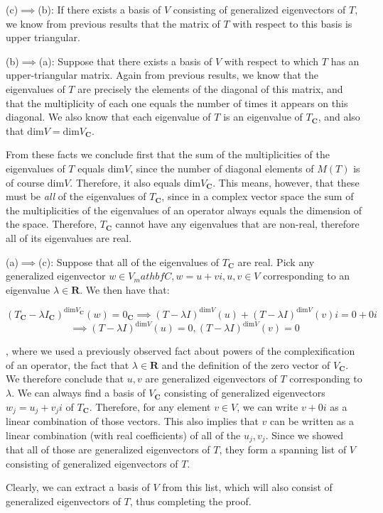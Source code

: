 \begin{solution}

    (c)$\implies$(b): If there exists a basis of $V$ consisting of generalized eigenvectors of $T$, we know from previous results that the matrix of $T$ with respect to this basis is upper triangular.

    (b)$\implies$(a): Suppose that there exists a basis of $V$ with respect to which $T$ has an upper-triangular matrix. Again from previous results, we know that the eigenvalues of $T$ are precisely the elements of the diagonal of this matrix, and that the multiplicity of each one equals the number of times it appears on this diagonal. We also know that each eigenvalue of $T$ is an eigenvalue of $T_\mathbf{C}$, and also that $\text{dim} V = \text{dim} V_\mathbf{C}$.

    From these facts we conclude first that the sum of the multiplicities of the eigenvalues of $T$ equals $\text{dim} V$, since the number of diagonal elements of $M(T)$ is of course $\text{dim} V$. Therefore, it also equals $\text{dim} V_\mathbf{C}$. This means, however, that these must be \textit{all} of the eigenvalues of $T_\mathbf{C}$, since in a complex vector space the sum of the multiplicities of the eigenvalues of an operator always equals the dimension of the space. Therefore, $T_\mathbf{C}$ cannot have any eigenvalues that are non-real, therefore all of its eigenvalues are real.

    (a)$\implies$(c): Suppose that all of the eigenvalues of $T_\mathbf{C}$ are real. Pick any generalized eigenvector $w \in V_mathbf{C}, w = u + vi, u, v \in V$ corresponding to an eigenvalue $\lambda \in \mathbf{R}$. We then have that:

    $$(T_\mathbf{C} - \lambda I_\mathbf{C})^{\text{dim} V_\mathbf{C}}(w) = 0_\mathbf{C} \implies (T-\lambda I)^{\text{dim} V}(u) + (T-\lambda I)^{\text{dim} V}(v)i = 0 + 0i$$
    $$\implies (T - \lambda I)^{\text{dim} V}(u) = 0, (T-\lambda I)^{\text{dim} V}(v) = 0$$

    , where we used a previously observed fact about powers of the complexification of an operator, the fact that $\lambda \in \mathbf{R}$ and the definition of the zero vector of $V_\mathbf{C}$. We therefore conclude that $u, v$ are generalized eigenvectors of $T$ corresponding to $\lambda$. We can always find a basis of $V_\mathbf{C}$ consisting of generalized eigenvectors $w_j = u_j + v_j i$ of $T_\mathbf{C}$. Therefore, for any element $v \in V$, we can write $v+0i$ as a linear combination of those vectors. This also implies that $v$ can be written as a linear combination (with real coefficients) of all of the $u_j, v_j$. Since we showed that all of those are generalized eigenvectors of $T$, they form a spanning list of $V$ consisting of generalized eigenvectors of $T$.

     Clearly, we can extract a basis of $V$ from this list, which will also consist of generalized eigenvectors of $T$, thus completing the proof.
\end{solution}

